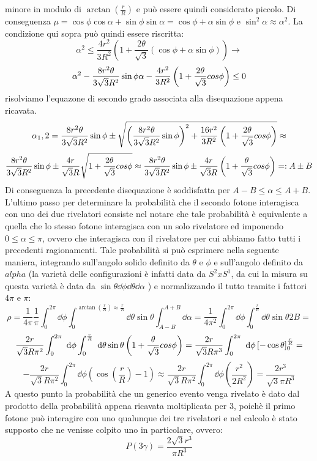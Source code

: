   minore in modulo di \(\arctan\left( \frac{r}{R} \right)\) e può essere quindi considerato piccolo. Di conseguenza \(\mu = \cos \phi \cos \alpha + \sin \phi \sin \alpha = \cos \phi + \alpha \sin \phi \)
  e \(\sin^2 \alpha \approx \alpha^2\). La condizione qui sopra può quindi essere riscritta:
  $$ \alpha^2 \le  \frac{4r^2}{3R^2} \left(1 + \frac{2\theta}{\sqrt{3}} \left( \cos \phi + \alpha \sin \phi \right)  \right)  \to $$
  $$ \alpha^2 -\frac{8r^2\theta}{3\sqrt{3}R^2}\sin \phi \alpha -\frac{4r^2}{3R^2}\left( 1 +\frac{2 \theta}{\sqrt{3}} \\cos \phi \right) \le 0 $$
  risolviamo l'equazone di secondo grado associata alla disequazione appena ricavata.
  $$ \alpha{_1,2} = \frac{8r^2\theta}{3\sqrt{3}R^2}\sin \phi \pm \sqrt{ \left( \frac{8r^2\theta}{3\sqrt{3}R^2}\sin \phi \right)^2 + \frac{16r^2}{3R^2}\left( 1 +\frac{2 \theta}{\sqrt{3}} \\cos \phi \right)} \approx $$
  $$ \frac{8r^2\theta}{3\sqrt{3}R^2}\sin \phi \pm \frac{4r}{\sqrt{3}R}\sqrt{ 1 +\frac{2 \theta}{\sqrt{3}} \\cos \phi} \approx \frac{8r^2\theta}{3\sqrt{3}R^2}\sin \phi \pm \frac{4r}{\sqrt{3}R}\left( 1 +\frac{\theta}{\sqrt{3}} \\cos \phi \right) =: A \pm B$$
  Di conseguenza la precedente disequazione è soddisfatta per \(A-B\le \alpha \le A + B\).\\
  L'ultimo passo per determinare la probabilità che il secondo fotone interagisca con uno dei due rivelatori consiste nel notare che tale probabilità è equivalente a quella
  che lo stesso fotone interagisca con un solo rivelatore ed imponendo \(0 \le \alpha \le \pi\), ovvero che interagisca con il rivelatore per cui abbiamo fatto tutti i precedenti
  ragionamenti. Tale probabilità si può esprimere nella seguente maniera, integrando sull'angolo solido definito da \(\theta\) e \(\phi\) e sull'angolo definito da \(alpha\)
  (la varietà delle configurazioni è infatti data da \(S^2 x S^1\), da cui la misura su questa varietà è data da \(\sin \theta \dd\phi \dd\theta \dd\alpha\) ) e normalizzando il tutto
  tramite i fattori \(4 \pi\) e \(\pi\):
  $$ \rho = \frac{1}{4\pi}\frac{1}{\pi}\int_{0}^{2\pi} \dd\phi \int_{0}^{\arctan\left(\frac{r}{R}\right)\approx \frac{r}{R}} \dd\theta \sin \theta \int_{A-B}^{A+B} \dd\alpha = 
  \frac{1}{4 \pi^2}\int_{0}^{2\pi} \dd\phi \int_{0}^{\frac{r}{R}} \dd\theta \sin \theta 2B =$$
  $$ \frac{2r}{\sqrt{3}R \pi^2}\int_{0}^{2\pi} \mathop{}\,\mathrm{d}\phi \int_{0}^{\frac{r}{R}} \mathop{}\,\mathrm{d}\theta \sin \theta \left( 1 +\frac{\theta}{\sqrt{3}} \\cos \phi \right) =
  \frac{2r}{\sqrt{3} R \pi^3}\int_{0}^{2\pi} \mathop{}\,\mathrm{d}\phi \left[ - \cos \theta \right]_{0}^{\frac{r}{R}} = $$ 
  $$- \frac{2r}{\sqrt{3} R \pi^2}\int_{0}^{2\pi} \dd\phi \left( \cos \left( \frac{r}{R} \right) -1 \right) \approx
  \frac{2r}{\sqrt{3} R \pi^2}\int_{0}^{2\pi} \dd\phi \left(\frac{r^2}{2R^2} \right) = \frac{2 r^3}{\sqrt{3} \pi R^3} $$
  A questo punto la probabilità che un generico evento venga rivelato è dato dal prodotto della probabilità appena ricavata moltiplicata per 3, poichè il primo fotone può
  interagire con uno qualunque dei tre rivelatori e nel calcolo è stato supposto che ne venisse colpito uno in particolare, ovvero:
  $$ P \left( 3 \gamma \right) = \frac{2 \sqrt{3} r^3}{ \pi R^3} $$